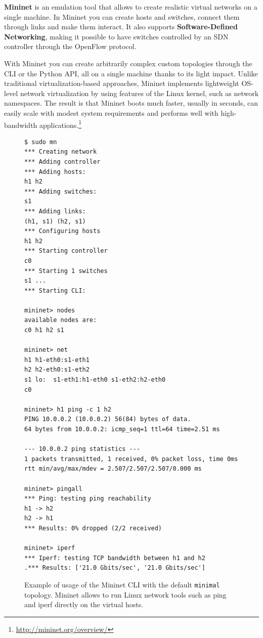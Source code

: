 \textbf{Mininet} is an emulation tool that allows to create realistic virtual networks on a single machine. In Mininet you can create hosts and switches, connect them through links and make them interact. It also supports \textbf{Software-Defined Networking}, making it possible to have switches controlled by an SDN controller through the OpenFlow protocol.

With Mininet you can create arbitrarily complex custom topologies through the CLI or the Python API, all on a single machine thanks to its light impact. Unlike traditional virtualization-based approaches, Mininet implements lightweight OS-level network virtualization by using features of the Linux kernel, such as network namespaces. The result is that Mininet boots much faster, usually in seconds, can easily scale with modest system requirements and performs well with high-bandwidth applications.\footnote{\url{http://mininet.org/overview/}}

\begin{figure}
    \centering
    \begin{verbatim}
$ sudo mn
*** Creating network
*** Adding controller
*** Adding hosts:
h1 h2
*** Adding switches:
s1
*** Adding links:
(h1, s1) (h2, s1)
*** Configuring hosts
h1 h2
*** Starting controller
c0
*** Starting 1 switches
s1 ...
*** Starting CLI:

mininet> nodes
available nodes are:
c0 h1 h2 s1

mininet> net
h1 h1-eth0:s1-eth1
h2 h2-eth0:s1-eth2
s1 lo:  s1-eth1:h1-eth0 s1-eth2:h2-eth0
c0

mininet> h1 ping -c 1 h2
PING 10.0.0.2 (10.0.0.2) 56(84) bytes of data.
64 bytes from 10.0.0.2: icmp_seq=1 ttl=64 time=2.51 ms

--- 10.0.0.2 ping statistics ---
1 packets transmitted, 1 received, 0% packet loss, time 0ms
rtt min/avg/max/mdev = 2.507/2.507/2.507/0.000 ms

mininet> pingall
*** Ping: testing ping reachability
h1 -> h2
h2 -> h1
*** Results: 0% dropped (2/2 received)

mininet> iperf
*** Iperf: testing TCP bandwidth between h1 and h2
.*** Results: ['21.0 Gbits/sec', '21.0 Gbits/sec']
    \end{verbatim}
    \caption{Example of usage of the Mininet CLI with the default \texttt{minimal} topology. Mininet allows to run Linux network tools such as ping and iperf directly on the virtual hosts.}
    \label{fig:mininet}
\end{figure}

